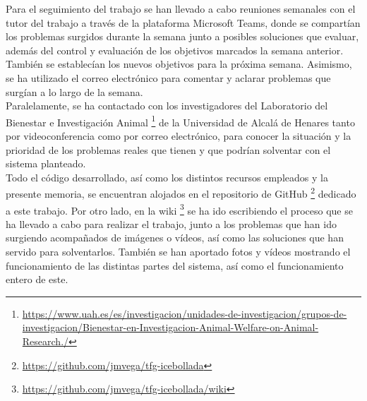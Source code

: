 Para el seguimiento del trabajo se han llevado a cabo reuniones semanales con el tutor del trabajo a través de la plataforma Microsoft Teams, donde se compartían los problemas surgidos durante la semana junto a posibles soluciones que evaluar, además del control y evaluación de los objetivos marcados la semana anterior. También se establecían los nuevos objetivos para la próxima semana. Asimismo, se ha utilizado el correo electrónico para comentar y aclarar problemas que surgían a lo largo de la semana.\\

Paralelamente, se ha contactado con los investigadores del Laboratorio del Bienestar e Investigación Animal \footnote{\url{https://www.uah.es/es/investigacion/unidades-de-investigacion/grupos-de-investigacion/Bienestar-en-Investigacion-Animal-Welfare-on-Animal-Research./}} de la Universidad de Alcalá de Henares tanto por videoconferencia como por correo electrónico, para conocer la situación y la prioridad de los problemas reales que tienen y que podrían solventar con el sistema planteado.\\

Todo el código desarrollado, así como los distintos recursos empleados y la presente memoria, se encuentran alojados en el repositorio de GitHub \footnote{\url{https://github.com/jmvega/tfg-icebollada}} dedicado a este trabajo. Por otro lado, en la wiki \footnote{\url{https://github.com/jmvega/tfg-icebollada/wiki}} se ha ido escribiendo el proceso que se ha llevado a cabo para realizar el trabajo, junto a los problemas que han ido surgiendo acompañados de imágenes o vídeos, así como las soluciones que han servido para solventarlos. También se han aportado fotos y vídeos mostrando el funcionamiento de las distintas partes del sistema, así como el funcionamiento entero de este.
